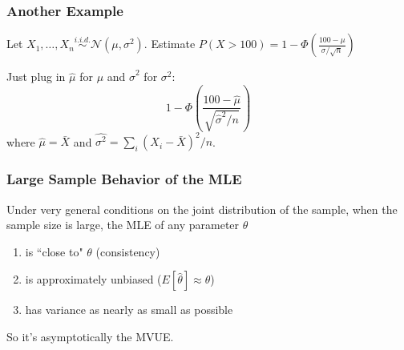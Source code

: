 \documentclass{beamer}
\begin{document}
\begin{frame}
\frametitle{Another Example}

Let $X_1, \ldots, X_n \overset{i.i.d.}{\sim} \mathcal{N}(\mu, \sigma^2)$. Estimate $P(X > 100) = 1 - \Phi\left(\frac{100 - \mu}{\sigma/\sqrt{n}}\right)$
\newline
\pause


Just plug in $\hat{\mu}$ for $\mu$ and $\hat{\sigma}^2$ for $\sigma^2$:
\[
1 - \Phi\left(\frac{100 - \hat{\mu} }{ \sqrt{\hat{\sigma}^2/n} }\right)
\]
where $\hat{\mu} = \bar{X}$ and $\hat{\sigma^2} = \sum_i(X_i - \bar{X})^2 / n$.


\end{frame}



\begin{frame}
\frametitle{Large Sample Behavior of the MLE}

Under very general conditions on the joint distribution of the sample, when the sample size is large, the MLE of any parameter $\theta$ 
\begin{enumerate}
\item is ``close to" $\theta$ (consistency)
\item is approximately unbiased ($E[\hat{\theta}] \approx \theta$)
\item has variance as nearly as small as possible
\end{enumerate}

So it's asymptotically the MVUE.

\end{frame}
\end{document}
